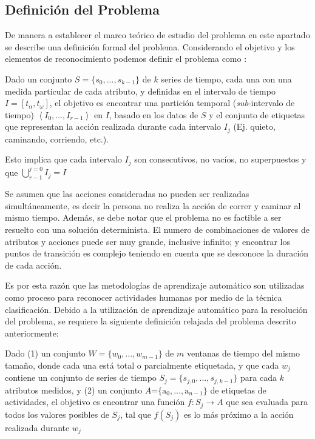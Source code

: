 \subsection{Definición del Problema}

\label{sec261:definicion-har}De manera a establecer el marco teórico
de estudio del problema  en este apartado se describe una
definición formal del problema. Considerando el objetivo y los elementos
de reconocimiento podemos definir el problema como \cite{LaraLabrador2013}:

\begin{definition}\label{def2:harp}Dado un conjunto
$S=\{s_{0},...,s_{k-1}\}$ de $k$ series de tiempo, cada una con
una medida particular de cada atributo, y definidas en el intervalo
de tiempo $I=\left[t_{\alpha},t_{\omega}\right]$, el objetivo es
encontrar una partición temporal (\emph{sub}-intervalo de tiempo)
$\left\langle I_{0},...,I_{r-1}\right\rangle $ en $I$, basado en
los datos de $S$ y el conjunto de etiquetas que representan la acción
realizada durante cada intervalo $I_{j}$ (Ej. quieto, caminando,
corriendo, etc.). 

Esto implica que cada intervalo $I_{j}$ son consecutivos, no vacíos,
no superpuestos y que ${\displaystyle \bigcup_{r-1}^{j=0}{I_{j}=I}}$
\end{definition}

Se asumen que las acciones consideradas no pueden ser realizadas simultáneamente,
es decir la persona no realiza la acción de correr y caminar al mismo
tiempo. Además, se debe notar que el problema  no es factible
a ser resuelto con una solución determinista. El numero de combinaciones
de valores de atributos y acciones puede ser muy grande, inclusive
infinito; y encontrar los puntos de transición es complejo teniendo
en cuenta que se desconoce la duración de cada acción. 

Es por esta razón que las metodologías de aprendizaje automático son
utilizadas como proceso para reconocer actividades humanas por medio
de la técnica clasificación. Debido a la utilización de aprendizaje
automático para la resolución del problema, se requiere la siguiente
definición relajada del problema  descrito anteriormente: 

\begin{definition}\label{def2:harp-rel}Dado
(1) un conjunto $W=\{w_{0},...,w_{m-1}\}$ de $m$ ventanas de tiempo
del mismo tamaño, donde cada una está total o parcialmente etiquetada,
y que cada $w_{j}$ contiene un conjunto de series de tiempo $S_{j}=\{s_{j,0},...,s_{j,k-1}\}$
para cada $k$ atributos medidos, y (2) un conjunto $A\text{=}\{\mathrm{a}_{0},...,\mathrm{a}_{n-1}\}$
de etiquetas de actividades, el objetivo es encontrar una función
$f\colon S_{j}\rightarrow A$ que sea evaluada para todos los valores
posibles de $S_{j}$, tal que $f(S_{j})$ es lo más próximo a la acción
realizada durante $w_{j}$ \end{definition}

